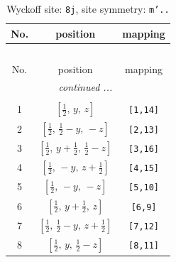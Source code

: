 \documentclass[fleqn,8pt]{jsarticle}
\begin{document}
\begin{longtable}{ccc}
\caption{Wyckoff site: {\tt 8j}, site symmetry: {\tt m'..}}
 \\
 \hline \hline
No. & position & mapping \\ \hline \endfirsthead

\multicolumn{2}{l}{\tablename\ \thetable{}} \\
 \hline \hline
No. & position & mapping \\ \hline \endhead

 \hline \hline
\multicolumn{2}{r}{\footnotesize\it continued ...} \\ \endfoot

 \hline \hline
\multicolumn{2}{r}{} \\ \endlastfoot

1 & $\left[ \frac{1}{2},\, y,\, z \right]$ & {\tt [1,14]} \\ \hline
2 & $\left[ \frac{1}{2},\, \frac{1}{2} - y,\, - z \right]$ & {\tt [2,13]} \\ \hline
3 & $\left[ \frac{1}{2},\, y + \frac{1}{2},\, \frac{1}{2} - z \right]$ & {\tt [3,16]} \\ \hline
4 & $\left[ \frac{1}{2},\, - y,\, z + \frac{1}{2} \right]$ & {\tt [4,15]} \\ \hline
5 & $\left[ \frac{1}{2},\, - y,\, - z \right]$ & {\tt [5,10]} \\ \hline
6 & $\left[ \frac{1}{2},\, y + \frac{1}{2},\, z \right]$ & {\tt [6,9]} \\ \hline
7 & $\left[ \frac{1}{2},\, \frac{1}{2} - y,\, z + \frac{1}{2} \right]$ & {\tt [7,12]} \\ \hline
8 & $\left[ \frac{1}{2},\, y,\, \frac{1}{2} - z \right]$ & {\tt [8,11]} \\
\end{longtable}
\renewcommand{\arraystretch}{1.2}
\end{document}
